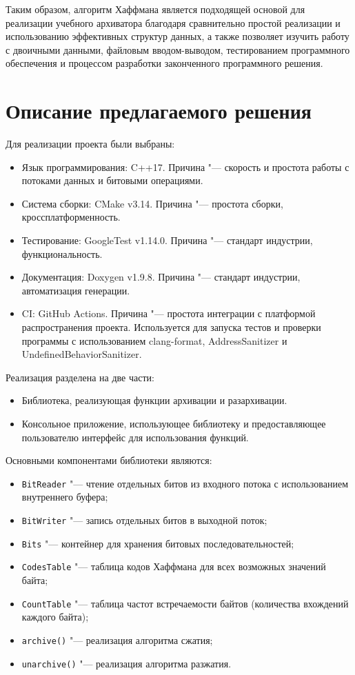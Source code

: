 \documentclass[a4paper]{article}
\begin{document}
Таким образом, алгоритм Хаффмана является подходящей основой для реализации учебного архиватора благодаря сравнительно простой реализации и использованию эффективных структур данных, а также позволяет изучить работу с двоичными данными, файловым вводом-выводом, тестированием программного обеспечения и процессом разработки законченного программного решения.

\section{Описание предлагаемого решения}

Для реализации проекта были выбраны:
\begin{itemize}
    \item Язык программирования: C++17. Причина "--- скорость и простота работы с потоками данных и битовыми операциями.
    \item Система сборки: CMake v3.14. Причина "--- простота сборки, кроссплатформенность.
    \item Тестирование: GoogleTest v1.14.0. Причина "--- стандарт индустрии, функциональность.
    \item Документация: Doxygen v1.9.8. Причина "--- стандарт индустрии, автоматизация генерации.
    \item CI: GitHub Actions. Причина "--- простота интеграции с платформой распространения проекта. Используется для запуска тестов и проверки программы с использованием clang-format, AddressSanitizer и UndefinedBehaviorSanitizer.
\end{itemize}

Реализация разделена на две части:
\begin{itemize}
    \item Библиотека, реализующая функции архивации и разархивации.
    \item Консольное приложение, использующее библиотеку и предоставляющее пользователю интерфейс для использования функций.
\end{itemize}

Основными компонентами библиотеки являются:
\begin{itemize}
    \item \texttt{BitReader} "--- чтение отдельных битов из входного потока с использованием внутреннего буфера;
    \item \texttt{BitWriter} "--- запись отдельных битов в выходной поток;
    \item \texttt{Bits} "--- контейнер для хранения битовых последовательностей;
    \item \texttt{CodesTable} "--- таблица кодов Хаффмана для всех возможных значений байта;
    \item \texttt{CountTable} "--- таблица частот встречаемости байтов (количества вхождений каждого байта);
    \item \texttt{archive()} "--- реализация алгоритма сжатия;
    \item \texttt{unarchive()} "--- реализация алгоритма разжатия.
\end{itemize}
\end{document}
